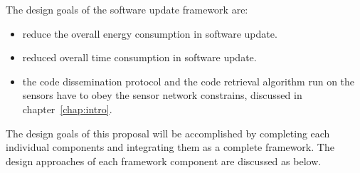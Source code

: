 The design goals of the software update framework are:
\begin{itemize}
\item reduce the overall energy consumption in software update.
\item reduced overall time consumption in software update.
\item the code dissemination protocol and the code retrieval algorithm run on the sensors have to obey the sensor network constrains, discussed in chapter~\ref{chap:intro}.
\end{itemize}

The design goals of this proposal will be accomplished by completing each individual components and integrating them as a complete framework. The design approaches of each framework component are discussed as below.


